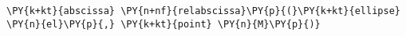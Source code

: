 \begin{Verbatim}[commandchars=\\\{\}]
      \PY{k+kt}{abscissa} \PY{n+nf}{relabscissa}\PY{p}{(}\PY{k+kt}{ellipse} \PY{n}{el}\PY{p}{,} \PY{k+kt}{point} \PY{n}{M}\PY{p}{)}
\end{Verbatim}
